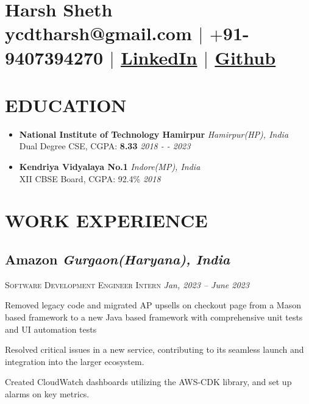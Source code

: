 \documentclass[11pt]{article}
\begin{document}
\section{\Huge{Harsh Sheth}\\ \large \normalfont ycdtharsh@gmail.com $|$ \normalfont $+$91-9407394270 $|$  \underline{\href{https://www.linkedin.com/in/harsh-sheth-2101}{LinkedIn}} $|$ \underline{\href{https://github.com/harsh-sheth}{Github}}}

\section{EDUCATION}
\begin{itemize}
  \item{
      \textbf{National Institute of Technology Hamirpur} \hfill \textit{Hamirpur(HP), India}\\
      Dual Degree CSE, CGPA: \textbf{8.33} \hfill \textit{2018 - - 2023}
  } 
  \item{
      \textbf{Kendriya Vidyalaya No.1} \hfill \textit{Indore(MP), India}\\
      XII CBSE Board, CGPA: 92.4\% \hfill \textit{2018}
  }
\end{itemize}


\section{WORK EXPERIENCE}
\subsection*{Amazon \hfill \normalsize \normalfont \textit{Gurgaon(Haryana), India}}

\vspace{-1ex}
\textsc{\textmd{Software Development Engineer Intern}} \hfill \normalsize \textit{Jan, 2023 -- June 2023}
\vspace{-1ex}

\begin{description}
\setlength{\itemindent}{2\parindent}
\setlength{\itemsep}{0em}
\item[$\bullet$]{Removed legacy code and migrated AP upsells on checkout page from a Mason based framework to a new Java based framework with comprehensive unit tests and UI automation tests}
\item[$\bullet$]{Resolved critical issues in a new service, contributing to its seamless launch and integration into the larger ecosystem.}
\item[$\bullet$]{Created CloudWatch dashboards utilizing the AWS-CDK library, and set up alarms on key metrics.}
\end{description}
\end{document}
